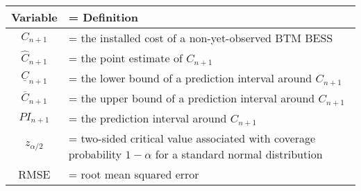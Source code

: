 \renewcommand\tabularxcolumn[1]{m{#1}}

\begin{tabularx}{\textwidth}{c>{\hsize=1.0\hsize\linewidth=\hsize}X}
\hline
\Tstrut  Variable     & Definition                                          \\ \hline
\Tstrut   $C_{n+1}$     & the installed cost of a non-yet-observed BTM BESS \Tstrut                                  \\ \hline
\Tstrut   $\widehat{C}_{n+1}$ & the point estimate of $C_{n+1}$                                                            \\ \hline
\Tstrut  $\underline{C}_{n+1}$   & the lower bound of a prediction interval around $C_{n+1}$                            \\ \hline
\Tstrut   $\overline{C}_{n+1}$  & the upper bound of a prediction interval around $C_{n+1}$                             \\ \hline
\Tstrut   $PI_{n+1}$    & the prediction interval around $C_{n+1}$ \\ \hline
   $z_{\alpha/2}$  & \tstrut two-sided critical value associated with coverage probability $1 - \alpha$ for a standard normal distribution \\ \hline
\Tstrut  RMSE     & root mean squared error                                                             \\ \hline                                         
\end{tabularx}